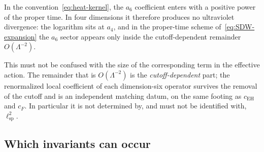 \documentclass[12pt,a4paper]{article}
\theoremstyle{remark}
\begin{document}
      In the convention~\eqref{eq:heat-kernel}, the $a_6$ coefficient enters with a positive power
      of the proper time. In four dimensions it therefore produces no ultraviolet divergence: the
      logarithm sits at $a_4$, and in the proper-time scheme of~\eqref{eq:SDW-expansion} the
      $a_6$ sector appears only inside the cutoff-dependent remainder $O(\Lambda^{-2})$.

      This must not be confused with the size of the corresponding term in the effective action.
      The remainder that is $O(\Lambda^{-2})$ is the \emph{cutoff-dependent} part; the
      renormalized local coefficient of each dimension-six operator survives the removal of the
      cutoff and is an independent matching datum, on the same footing as $c_{\mathrm{EH}}$ and
      $c_F$. In particular it is not determined by, and must not be identified with,
      $\ell_{\mathrm{sp}}^2$.

    \subsection{Which invariants can occur}
      \label{ssec:a6-inventory}
\end{document}
